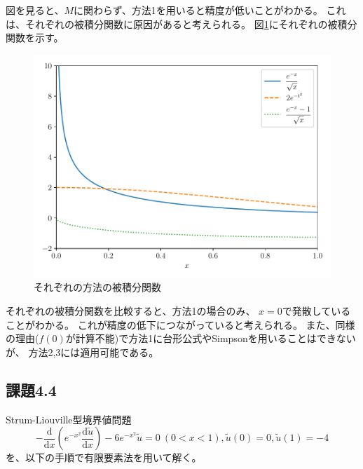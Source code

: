 \documentclass[a4j, titlepage]{jsarticle}
\numberwithin{equation}{section}
\begin{document}
                図を見ると、$M$に関わらず、方法1を用いると精度が低いことがわかる。
                これは、それぞれの被積分関数に原因があると考えられる。
                図\ref{fig:fdiff}にそれぞれの被積分関数を示す。
                \begin{figure}[h]
                    \centering
                    \includegraphics[width=0.8\hsize]{kadai3/2/kosatu.pdf}
                    \caption{それぞれの方法の被積分関数}
                    \label{fig:fdiff}
                \end{figure}

                それぞれの被積分関数を比較すると、方法1の場合のみ、
                $x=0$で発散していることがわかる。
                これが精度の低下につながっていると考えられる。
                また、同様の理由($f(0)$が計算不能)で方法1に台形公式やSimpsonを用いることはできないが、
                方法2,3には適用可能である。

    \subsection{課題4.4}
        Strum-Liouville型境界値問題
        \begin{equation}
            -\frac{\mathrm{d}}{\mathrm{d}x}\left(e^{-x^2}\frac{\mathrm{d}\tilde{u}}{\mathrm{d}x}\right)-6e^{-x^2}\tilde{u}=0 \ (0<x<1), \tilde{u}(0) = 0, \tilde{u}(1)=-4 \label{equ:strum}
        \end{equation}
        を、以下の手順で有限要素法を用いて解く。
\end{document}
